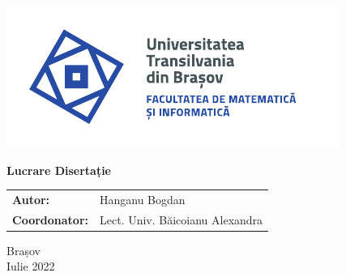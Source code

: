 \begin{titlepage}
	
	\vspace*{-3cm}
	\hspace{-2cm}
	\includegraphics[width=0.8\linewidth]{./images/Logo-UT-MI-SPOT-RO}

	\begin{center}
		\Huge
		
		\vspace{2cm}
		
		\textbf{Lucrare Disertație}
		
		\vfill
				
		\Large
		\begin{tabular}{ll}
			\textbf{Autor:}&Hanganu Bogdan\\
			\textbf{Coordonator:}&Lect. Univ. Băicoianu Alexandra
		\end{tabular}
		
		\vfill
		
		\Large
		Brașov\\
		Iulie 2022
        
	\end{center}
\end{titlepage}